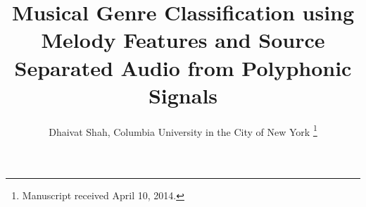 \documentclass[12pt,journal,compsoc]{IEEEtran}
\begin{document}
%
\title{Musical Genre Classification using Melody Features and Source Separated Audio from Polyphonic Signals}
%
%
%
%

\author{Dhaivat Shah, Columbia University in the City of New York%
\thanks{Manuscript received April 10, 2014.}}

% 
%
\end{document}
